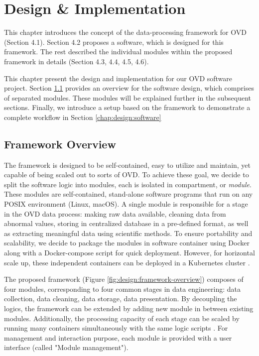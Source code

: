 \chapter{Design \& Implementation} \label{chap:design}


This chapter introduces the concept of the data-processing framework for OVD (Section 4.1). 
Section 4.2 proposes a software, which is designed for this framework.
The rest described the individual modules within the proposed framework in details (Section 4.3, 4.4, 4.5, 4.6).

This chapter present the design and implementation for our OVD software project.
Section \ref{chap:design:overview} provides an overview for the software design, which comprises of separated modules.
These modules will be explained further in the subsequent sections.
Finally, we introduce a setup based on the framework to demonstrate a complete workflow in Section \ref{chap:design:software} 


\section{Framework Overview}\label{chap:design:overview}
The framework is designed to be self-contained, easy to utilize and maintain, yet capable of being scaled out to sorts of OVD.
To achieve these goal, we decide to split the software logic into modules, each is isolated in compartment, or \textit{module}.
These modules are self-contained, stand-alone software programs that run on any POSIX environment (Linux, macOS).
A single module is responsible for a stage in the OVD data process: making raw data available, cleaning data from abnormal values, storing in  centralized database in a pre-defined format, as well as extracting meaningful data using scientific methods.
To ensure portability and scalability, we decide to package the modules in software container using Docker along with a Docker-compose script for quick deployment.
However, for horizontal scale up, these independent containers can be deployed in a Kubernetes cluster .


The proposed framework (Figure \ref{fig:design:framework-overview}) composes of four modules, corresponding to four common stages in data engineering: data collection, data cleaning, data storage, data presentation. 
By decoupling the logics, the framework can be extended by adding new module in between existing modules. 
Additionally, the processing capacity of each stage can be scaled by running many containers simultaneously with the same logic scripts .
For management and interaction purpose, each module is provided with a user interface (called "Module management").

